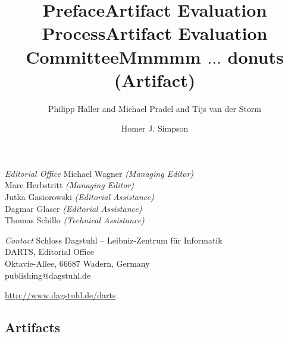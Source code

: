 \documentclass[a4paper,UKenglish]{dartsmaster}
\begin{document}
\begin{publicationinfo}

\vfill


\emph{Editorial Office}\newline
Michael Wagner \emph{(Managing Editor)}\\
Marc Herbstritt \emph{(Managing Editor)}\\
Jutka Gasiorowski \emph{(Editorial Assistance)}\\
Dagmar Glaser \emph{(Editorial Assistance)}\\
Thomas Schillo \emph{(Technical Assistance)}

\bigskip
\emph{Contact}\newline
Schloss Dagstuhl -- Leibniz-Zentrum f\"ur Informatik\\
DARTS, Editorial Office\\
Oktavie-Allee, 66687 Wadern, Germany\\ 
publishing@dagstuhl.de


\bigskip

\url{http://www.dagstuhl.de/darts}
 
 \thispagestyle{empty}
 \onecolumn

\newpage

\end{publicationinfo}




\begin{contentslist}

\contitem
\title{Preface}
\author{Philipp Haller and Michael Pradel and Tijs van der Storm}

\contitem
\title{Artifact Evaluation Process}
\author{ }

\contitem
\title{Artifact Evaluation Committee}
\author{ }

\part{Artifacts}


\contitem
\title{Mmmmm $\ldots$ donuts (Artifact)}
\author{Homer J. Simpson}


\end{contentslist}
\end{document}

